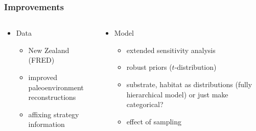 \documentclass{beamer}
\begin{document}
\begin{frame}
  \frametitle{Improvements}
  \begin{columns}
    \begin{column}{0.5\textwidth}
      \begin{itemize}
        \item Data
          \begin{itemize}
            \item New Zealand (FRED)
            \item improved paleoenvironment reconstructions
            \item affixing strategy information
          \end{itemize}
      \end{itemize}
    \end{column}
    \begin{column}{0.5\textwidth}
      \begin{itemize}
        \item Model
          \begin{itemize}
            \item extended sensitivity analysis
            \item robust priors (\(t\)-distribution)
            \item substrate, habitat as distributions (fully hierarchical model) or just make categorical?
            \item effect of sampling 
          \end{itemize}
      \end{itemize}
    \end{column}
  \end{columns}
\end{frame}
\end{document}
